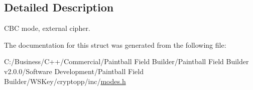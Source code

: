 \subsection{Detailed Description}
CBC mode, external cipher. 

The documentation for this struct was generated from the following file:\begin{DoxyCompactItemize}
\item 
C:/Business/C++/Commercial/Paintball Field Builder/Paintball Field Builder v2.0.0/Software Development/Paintball Field Builder/WSKey/cryptopp/inc/\hyperlink{modes_8h}{modes.h}\end{DoxyCompactItemize}

